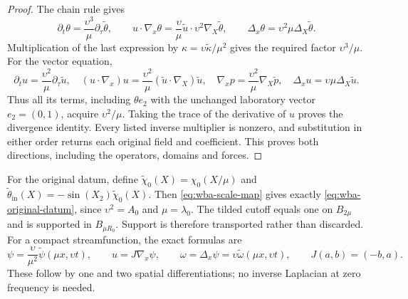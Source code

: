 \begin{proof}
The chain rule gives
\[
 \partial_t\theta=\frac{\upsilon^3}{\mu}\partial_\tau\widetilde\theta,
 \qquad u\cdot\nabla_x\theta=
 \frac{\upsilon}{\mu}\widetilde u\cdot
 \upsilon^2\nabla_X\widetilde\theta,
 \qquad\Delta_x\theta=\upsilon^2\mu\Delta_X\widetilde\theta.
\]
Multiplication of the last expression by
$\kappa=\upsilon\widetilde\kappa/\mu^2$ gives the required factor
$\upsilon^3/\mu$. For the vector equation,
\[
 \partial_tu=\frac{\upsilon^2}{\mu}\partial_\tau\widetilde u,
 \quad(u\cdot\nabla_x)u=\frac{\upsilon^2}{\mu}
 (\widetilde u\cdot\nabla_X)\widetilde u,
 \quad\nabla_xp=\frac{\upsilon^2}{\mu}\nabla_X\widetilde p,
 \quad\Delta_xu=\upsilon\mu\Delta_X\widetilde u.
\]
Thus all its terms, including $\theta e_2$ with the unchanged laboratory
vector $e_2=(0,1)$, acquire $\upsilon^2/\mu$.
Taking the trace of the derivative of $u$ proves the divergence identity.
Every listed inverse multiplier is nonzero, and substitution in either
order returns each original field and coefficient. This proves both
directions, including the operators, domains and forces.
\end{proof}

For the original datum, define
$\widetilde\chi_0(X)=\chi_0(X/\mu)$ and
$\widetilde\theta_{\mathrm{in}}(X)=-\sin(X_2)\widetilde\chi_0(X)$.
Then \eqref{eq:wba-scale-map} gives exactly
\eqref{eq:wba-original-datum}, since $\upsilon^2=A_0$ and
$\mu=\lambda_0$. The tilded cutoff equals one on $B_{2\mu}$ and is
supported in $B_{\mu R_0}$. Support is therefore transported rather than
discarded. For a compact streamfunction, the exact formulas are
\begin{equation}\label{eq:wba-stream-scale}
 \psi=\frac{\upsilon}{\mu^2}\widetilde\psi(\mu x,\upsilon t),
 \qquad u=J\nabla_x\psi,
 \qquad\omega=\Delta_x\psi
       =\upsilon\widetilde\omega(\mu x,\upsilon t),
 \qquad J(a,b)=(-b,a).
\end{equation}
These follow by one and two spatial differentiations; no inverse Laplacian
at zero frequency is needed.

